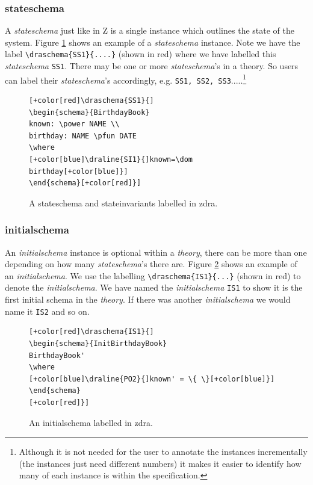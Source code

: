 \subsubsection{stateschema}

A \emph{stateschema} just like in Z is a single instance which outlines the state of the system. Figure \ref{fig:exampleofss} shows an example of a \emph{stateschema} instance. Note we have the label \verb|\draschema{SS1}{....}| (shown in red) where we have labelled this \emph{stateschema} \verb|SS1|. There may be one or more \emph{stateschema}'s in a theory. So users can label their \emph{stateschema}'s accordingly, e.g. \verb|SS1, SS2, SS3|.....\footnote{Although it is not needed for the user to annotate the instances incrementally (the instances just need different numbers) it makes it easier to identify how many of each instance is within the specification.}

\begin{figure}[H]
\centering
\begin{footnotesize}
\begin{BVerbatim}[commandchars=+\[\]]
[+color[red]\draschema{SS1}{]
\begin{schema}{BirthdayBook}
known: \power NAME \\ 
birthday: NAME \pfun DATE 
\where 
[+color[blue]\draline{SI1}{]known=\dom birthday[+color[blue]}]
\end{schema}[+color[red]}]
\end{BVerbatim}
\end{footnotesize}
\caption{\label{fig:exampleofss} A stateschema and stateinvariants labelled in \gls{zdra}.}
\end{figure}

\subsubsection{initialschema}

An \emph{initialschema} instance is optional within a \emph{theory}, there can be more than one depending on how many \emph{stateschema}'s there are. Figure \ref{fig:exampleofis} shows an example of an \emph{initialschema}. We use the labelling \verb|\draschema{IS1}{...}| (shown in red) to denote the \emph{initialschema}. We have named the \emph{initialschema} \verb|IS1| to show it is the first initial schema in the \emph{theory}. If there was another \emph{initialschema} we would name it \verb|IS2| and so on.

\begin{figure}[H]
\centering
\begin{footnotesize}
\begin{BVerbatim}[commandchars=+\[\]]
[+color[red]\draschema{IS1}{]
\begin{schema}{InitBirthdayBook} 
BirthdayBook' 
\where 
[+color[blue]\draline{PO2}{]known' = \{ \}[+color[blue]}]
\end{schema}
[+color[red]}]
\end{BVerbatim}
\caption{\label{fig:exampleofis} An initialschema labelled in \gls{zdra}.}
\end{footnotesize}
\end{figure}

